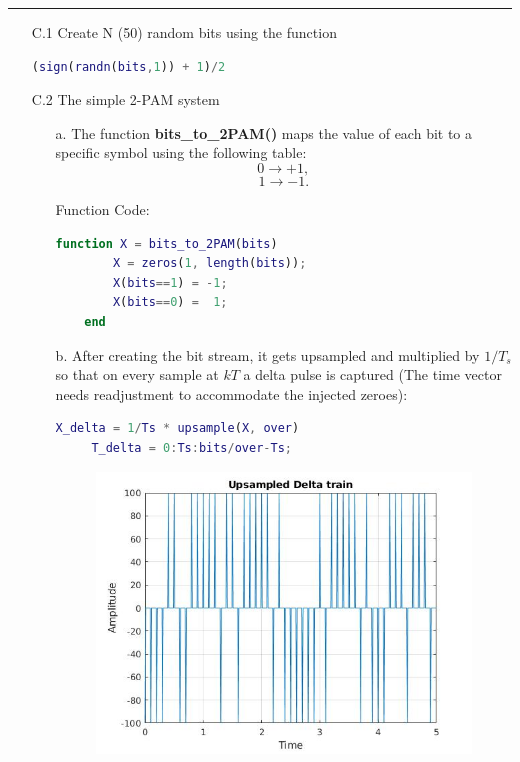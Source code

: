 \documentclass[12pt, a4paper]{article}
\begin{document}
\noindent\rule{\textwidth}{.5pt}



\begin{enumerate}

\item[C.1] Create N (50) random bits using the function 

\begin{lstlisting}[language=MATLAB]
    (sign(randn(bits,1)) + 1)/2
\end{lstlisting}
    	

\item[C.2] The simple 2-PAM system

\begin{enumerate}

\item[a.]The function \textbf{bits\_to\_2PAM()} maps the value of each bit to a specific symbol using the following table:
 \[0 \longrightarrow +1, \]
 \[1 \longrightarrow -1. \]
 
\pagebreak
Function Code:

\begin{lstlisting}[language=MATLAB]
    function X = bits_to_2PAM(bits)
        X = zeros(1, length(bits));
        X(bits==1) = -1;
        X(bits==0) =  1;
    end
\end{lstlisting}

\item[b.] After creating the bit stream, it gets upsampled and multiplied by $1/T_s$ so that on every sample at $kT$ a delta pulse is captured (The time vector needs readjustment to accommodate the injected zeroes): 

\begin{lstlisting}[language=MATLAB]
     X_delta = 1/Ts * upsample(X, over)
     T_delta = 0:Ts:bits/over-Ts;
\end{lstlisting}
\begin{figure}[H]
\centering
\noindent\includegraphics[width=\textwidth]{delta_train_up.jpg}
\end{figure}


\end{enumerate}
\end{enumerate}
\end{document}

